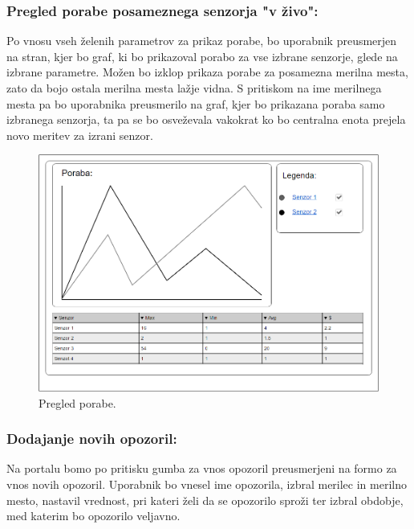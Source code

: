 \documentclass[12pt,a4paper,titlepage,openany]{report}
\begin{document}
\subsubsection{Pregled porabe posameznega senzorja "v živo":}
Po vnosu vseh želenih parametrov za prikaz porabe, bo uporabnik preusmerjen na stran, kjer bo graf, ki bo prikazoval porabo za vse izbrane senzorje, glede na izbrane parametre. Možen bo izklop prikaza porabe za posamezna merilna mesta, zato da bojo ostala merilna mesta lažje vidna. S pritiskom na ime merilnega mesta pa bo uporabnika preusmerilo na graf, kjer bo prikazana poraba samo izbranega senzorja, ta pa se bo osveževala vakokrat ko bo centralna enota prejela novo meritev za izrani senzor.

\begin{figure}[H]
\begin{center}
\includegraphics[width=1\linewidth]{Slike/PregledPorabe.png}
\end{center}
\caption{Pregled porabe.}\label{slika:PregledPorabe}
\end{figure}

\subsubsection{Dodajanje novih opozoril:}
Na portalu bomo po pritisku gumba za vnos opozoril preusmerjeni na formo za vnos novih opozoril. Uporabnik bo vnesel ime opozorila, izbral merilec in merilno mesto, nastavil vrednost, pri kateri želi da se opozorilo sproži ter izbral obdobje, med katerim bo opozorilo veljavno.
\end{document}
